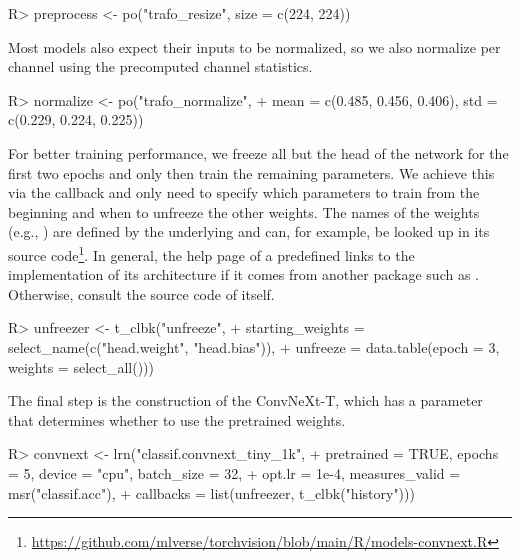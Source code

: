 \documentclass[article,shortnames]{jss}
\theoremstyle{definition}
\renewenvironment{CodeChunk}{\par\addvspace{0.6\baselineskip}\noindent\begin{minipage}{\linewidth}}{\end{minipage}\par\vspace{0.6\baselineskip}}
\begin{document}
\begin{CodeChunk}
\begin{CodeInput}
R> preprocess <- po("trafo_resize", size = c(224, 224))
\end{CodeInput}
\end{CodeChunk}

Most  models also expect their inputs to be normalized, so we also normalize per channel using the precomputed channel statistics.

\begin{CodeChunk}
\begin{CodeInput}
R> normalize <- po("trafo_normalize",
+    mean = c(0.485, 0.456, 0.406), std = c(0.229, 0.224, 0.225))
\end{CodeInput}
\end{CodeChunk}

For better training performance, we freeze all but the head of the network for the first two epochs and only then train the remaining parameters.
We achieve this via the  callback and only need to specify which parameters to train from the beginning and when to unfreeze the other weights.
The names of the weights (e.g., ) are defined by the underlying  and can, for example, be looked up in its source code\footnote{\url{https://github.com/mlverse/torchvision/blob/main/R/models-convnext.R}}.
In general, the help page of a predefined  links to the implementation of its architecture if it comes from another package such as .
Otherwise, consult the source code of \mlrttorch{} itself.

\begin{CodeChunk}
\begin{CodeInput}
R> unfreezer <- t_clbk("unfreeze",
+    starting_weights = select_name(c("head.weight", "head.bias")),
+    unfreeze = data.table(epoch = 3, weights = select_all()))
\end{CodeInput}
\end{CodeChunk}

The final step is the construction of the ConvNeXt-T, which has a parameter  that determines whether to use the pretrained weights.

\begin{CodeChunk}
\begin{CodeInput}
R> convnext <- lrn("classif.convnext_tiny_1k",
+    pretrained = TRUE, epochs = 5, device = "cpu", batch_size = 32,
+    opt.lr = 1e-4, measures_valid = msr("classif.acc"),
+    callbacks = list(unfreezer, t_clbk("history")))
\end{CodeInput}
\end{CodeChunk}
\end{document}
